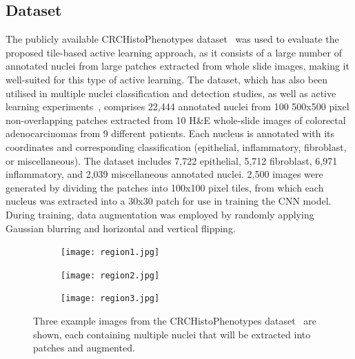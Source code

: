 \subsection{Dataset}
\label{subsec:active_dataset}
The publicly available CRCHistoPhenotypes dataset~\citep{sirinukunwattana2016locality} was used to evaluate the proposed tile-based active learning approach, as it consists of a large number of annotated nuclei from large patches extracted from whole slide images, making it well-suited for this type of active learning. The dataset, which has also been utilised in multiple nuclei classification and detection studies, as well as active learning experiments~\citep{shao2018deep}, comprises 22,444 annotated nuclei from 100 500x500 pixel non-overlapping patches extracted from 10 H\&E whole-slide images of colorectal adenocarcinomas from 9 different patients. Each nucleus is annotated with its coordinates and corresponding classification (epithelial, inflammatory, fibroblast, or miscellaneous). The dataset includes 7,722 epithelial, 5,712 fibroblast, 6,971 inflammatory, and 2,039 miscellaneous annotated nuclei. 2,500 images were generated by dividing the patches into 100x100 pixel tiles, from which each nucleus was extracted into a 30x30 patch for use in training the CNN model. During training, data augmentation was employed by randomly applying Gaussian blurring and horizontal and vertical flipping.

\begin{figure}[t!]
	\centering
	\begin{subfigure}{0.3\textwidth}
		\texttt{[image: region1.jpg]}
	\end{subfigure}
	\begin{subfigure}{0.3\textwidth}
		\texttt{[image: region2.jpg]}
	\end{subfigure}
	\begin{subfigure}{0.3\textwidth}
		\texttt{[image: region3.jpg]}
	\end{subfigure}
	\caption{Three example images from the CRCHistoPhenotypes dataset~\cite{sirinukunwattana2016locality} are shown, each containing multiple nuclei that will be extracted into patches and augmented.}
	\label{fig:region_example}
\end{figure}

